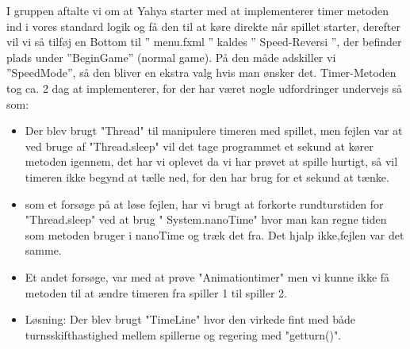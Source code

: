 I gruppen aftalte vi om at Yahya starter med at implementerer timer metoden ind i vores standard logik og få den til at køre direkte når spillet starter, derefter vil vi så tilføj en Bottom til ” menu.fxml ” kaldes ” Speed-Reversi ”, der befinder plads under ”BeginGame” (normal game).
På den måde adskiller vi ”SpeedMode”, så den bliver en ekstra valg hvis man ønsker det. 
Timer-Metoden tog ca. 2 dag at implementerer, for der har været nogle udfordringer undervejs så som: 
\begin{itemize}

\item Der blev brugt "Thread" til manipulere timeren med spillet, men fejlen var at ved bruge af "Thread.sleep" vil det tage programmet et sekund at kører metoden igennem, det har vi oplevet da vi har prøvet at spille hurtigt, så vil timeren ikke begynd at tælle ned, for den har brug for et sekund at tænke. 
\item som et forsøge på at løse fejlen, har vi brugt at forkorte rundturstiden for "Thread.sleep" ved at brug " System.nanoTime" hvor man kan regne tiden som metoden bruger i nanoTime og træk det fra. Det hjalp ikke,fejlen var det samme. 
\item Et andet forsøge, var med at prøve "Animationtimer" men vi kunne ikke få metoden til at ændre timeren fra spiller 1 til spiller 2. 

\item Løsning: 
Der blev brugt "TimeLine" hvor den virkede fint med både turnsskifthastighed mellem spillerne og regering med "getturn()". 
\end{itemize}
